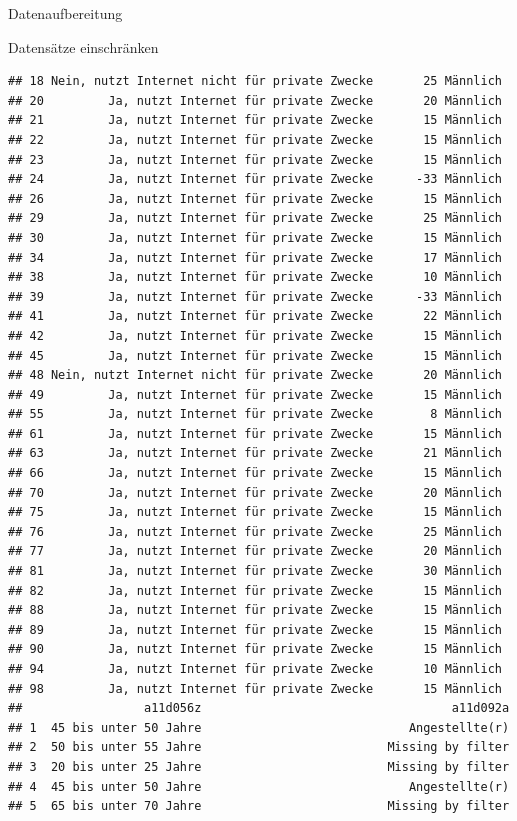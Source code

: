 \documentclass[ignorenonframetext,]{beamer}
\begin{document}
\begin{frame}[fragile]{Datenaufbereitung}
\begin{block}{Datensätze einschränken}
\begin{verbatim}
## 18 Nein, nutzt Internet nicht für private Zwecke       25 Männlich
## 20         Ja, nutzt Internet für private Zwecke       20 Männlich
## 21         Ja, nutzt Internet für private Zwecke       15 Männlich
## 22         Ja, nutzt Internet für private Zwecke       15 Männlich
## 23         Ja, nutzt Internet für private Zwecke       15 Männlich
## 24         Ja, nutzt Internet für private Zwecke      -33 Männlich
## 26         Ja, nutzt Internet für private Zwecke       15 Männlich
## 29         Ja, nutzt Internet für private Zwecke       25 Männlich
## 30         Ja, nutzt Internet für private Zwecke       15 Männlich
## 34         Ja, nutzt Internet für private Zwecke       17 Männlich
## 38         Ja, nutzt Internet für private Zwecke       10 Männlich
## 39         Ja, nutzt Internet für private Zwecke      -33 Männlich
## 41         Ja, nutzt Internet für private Zwecke       22 Männlich
## 42         Ja, nutzt Internet für private Zwecke       15 Männlich
## 45         Ja, nutzt Internet für private Zwecke       15 Männlich
## 48 Nein, nutzt Internet nicht für private Zwecke       20 Männlich
## 49         Ja, nutzt Internet für private Zwecke       15 Männlich
## 55         Ja, nutzt Internet für private Zwecke        8 Männlich
## 61         Ja, nutzt Internet für private Zwecke       15 Männlich
## 63         Ja, nutzt Internet für private Zwecke       21 Männlich
## 66         Ja, nutzt Internet für private Zwecke       15 Männlich
## 70         Ja, nutzt Internet für private Zwecke       20 Männlich
## 75         Ja, nutzt Internet für private Zwecke       15 Männlich
## 76         Ja, nutzt Internet für private Zwecke       25 Männlich
## 77         Ja, nutzt Internet für private Zwecke       20 Männlich
## 81         Ja, nutzt Internet für private Zwecke       30 Männlich
## 82         Ja, nutzt Internet für private Zwecke       15 Männlich
## 88         Ja, nutzt Internet für private Zwecke       15 Männlich
## 89         Ja, nutzt Internet für private Zwecke       15 Männlich
## 90         Ja, nutzt Internet für private Zwecke       15 Männlich
## 94         Ja, nutzt Internet für private Zwecke       10 Männlich
## 98         Ja, nutzt Internet für private Zwecke       15 Männlich
##                 a11d056z                                   a11d092a
## 1  45 bis unter 50 Jahre                             Angestellte(r)
## 2  50 bis unter 55 Jahre                          Missing by filter
## 3  20 bis unter 25 Jahre                          Missing by filter
## 4  45 bis unter 50 Jahre                             Angestellte(r)
## 5  65 bis unter 70 Jahre                          Missing by filter

\end{verbatim}
\end{block}
\end{frame}
\end{document}
